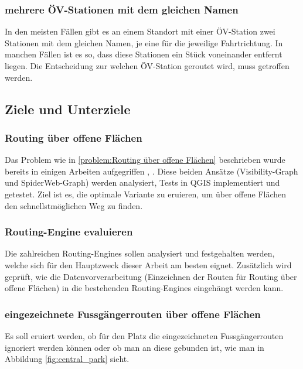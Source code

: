 \subsubsection{mehrere ÖV-Stationen mit dem gleichen Namen}
\label{problem:mehrere ÖV-Stationen mit dem gleichen Namen}
In den meisten Fällen gibt es an einem Standort mit einer ÖV-Station zwei Stationen mit dem gleichen Namen, je eine für die jeweilige Fahrtrichtung. In manchen Fällen ist es so, dass diese Stationen ein Stück voneinander entfernt liegen. Die Entscheidung zur welchen ÖV-Station geroutet wird, muss getroffen werden.
	
\subsection{Ziele und Unterziele}
\label{Ziele und Unterziele}

\subsubsection{Routing über offene Flächen}
\label{target:Routing über offene Flächen}
Das Problem wie in \ref{problem:Routing über offene Flächen} beschrieben wurde bereits in einigen Arbeiten aufgegriffen \cite{graser_visibility_graph}, \cite{dzafic_spider_web_graph}. Diese beiden Ansätze (Visibility-Graph und SpiderWeb-Graph) werden analysiert, Tests in QGIS implementiert und getestet. Ziel ist es, die optimale Variante zu eruieren, um über offene Flächen den schnellstmöglichen Weg zu finden.

\subsubsection{Routing-Engine evaluieren}
\label{target:Routing-Enginge evaluieren}
Die zahlreichen Routing-Engines sollen analysiert und festgehalten werden, welche sich für den Hauptzweck dieser Arbeit am besten eignet. Zusätzlich wird geprüft, wie die Datenvorverarbeitung (Einzeichnen der Routen für Routing über offene Flächen) in die bestehenden Routing-Engines eingehängt werden kann.

\subsubsection{eingezeichnete Fussgängerrouten über offene Flächen}
\label{target:eingezeichnete Fussgängerrouten über offene Flächen}
Es soll eruiert werden, ob für den Platz die eingezeichneten Fussgängerrouten ignoriert werden können oder ob man an diese gebunden ist, wie man in Abbildung \ref{fig:central_park} sieht.

